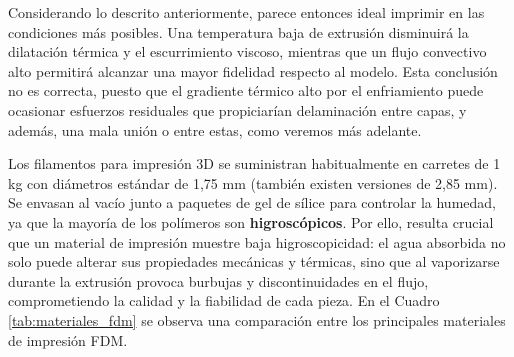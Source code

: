 Considerando lo descrito anteriormente, parece entonces ideal imprimir en las condiciones más  posibles. Una temperatura baja de extrusión disminuirá la dilatación térmica y el escurrimiento viscoso, mientras que un flujo convectivo alto permitirá alcanzar una mayor fidelidad respecto al modelo. Esta conclusión no es correcta, puesto que el gradiente térmico alto por el enfriamiento puede ocasionar esfuerzos residuales que propiciarían delaminación entre capas, y además, una mala unión o  entre estas, como veremos más adelante.

Los filamentos para impresión 3D se suministran habitualmente en carretes de 1 kg con diámetros estándar de 1,75 mm (también existen versiones de 2,85 mm). Se envasan al vacío junto a paquetes de gel de sílice para controlar la humedad, ya que la mayoría de los polímeros son \textbf{higroscópicos}. Por ello, resulta crucial que un material de impresión muestre baja higroscopicidad: el agua absorbida no solo puede alterar sus propiedades mecánicas y térmicas, sino que al vaporizarse durante la extrusión provoca burbujas y discontinuidades en el flujo, comprometiendo la calidad y la fiabilidad de cada pieza. En el Cuadro \ref{tab:materiales_fdm} se observa una comparación entre los principales materiales de impresión FDM.

